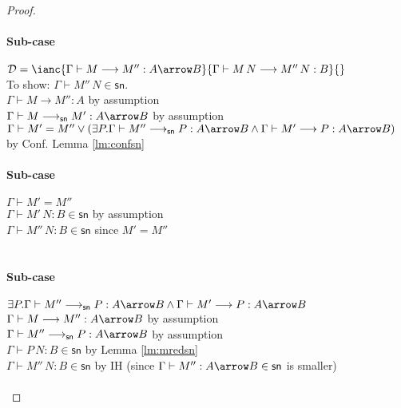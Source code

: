 \documentclass{article}
\newcommand{\csn}{\mathsf{sn}}
\newcommand{\red}{\longrightarrow}
\newcommand{\redsn}{\longrightarrow_\csn}
\begin{document}
\begin{proof}
\paragraph{Sub-case} $\mathcal{D} = \ianc{\Gamma \vdash M \red M'' : A \arrow B}{\Gamma \vdash M\,N \red M''\,N: B}{}$
\\[1em]
To show: $\Gamma \vdash M''\,N \in \csn$.
\\[1em]
$\Gamma \vdash M \red M'' : A $ \hfill by assumption \\
$\Gamma \vdash M \redsn M' : A \arrow B$ \hfill by assumption \\
$\Gamma \vdash M' = M'' \vee (\exists P. \Gamma \vdash M'' \redsn P : A \arrow B \wedge \Gamma \vdash M' \red P: A \arrow B)$ \hfill by Conf. Lemma \ref{lm:confsn} \\[0.5em]

\paragraph{Sub-case} $\Gamma \vdash M' = M''$
\\[1em]
$\Gamma \vdash M'\,N : B \in \csn$ \hfill by assumption \\
$\Gamma \vdash M''\,N : B \in \csn$ \hfill since $M' = M''$ \\
\\[0.5em]

\paragraph{Sub-case} $\exists P. \Gamma \vdash M'' \redsn P : A \arrow B \wedge \Gamma \vdash M' \red P: A \arrow B$
\\[1em]
$\Gamma \vdash M \red M'' : A \arrow B$ \hfill by assumption \\
$\Gamma \vdash M'' \redsn P : A \arrow B$ \hfill by assumption \\
$\Gamma \vdash P\,N : B \in \csn$ \hfill by Lemma \ref{lm:mredsn} \\
$\Gamma \vdash M''\,N : B \in \csn$ \hfill by IH (since $\Gamma \vdash M'': A \arrow B \in \csn$ is smaller) \\
\\[0.5em]


\end{proof}
\end{document}
